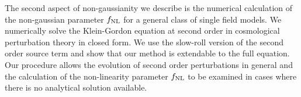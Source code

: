 The second aspect of non-gaussianity we describe is the numerical calculation
of the non-gaussian parameter $f_{\mathrm{NL}}$ for a general class of single field models.
We numerically solve the Klein-Gordon equation at second
order in cosmological perturbation theory in closed form. 
We use the slow-roll
version of the second order source term and show that our method is extendable
to the full equation.
Our procedure allows the evolution of second order
perturbations in general and the calculation of the non-linearity parameter
$f_{\mathrm{NL}}$ to be examined in cases where there is no analytical solution available. 

